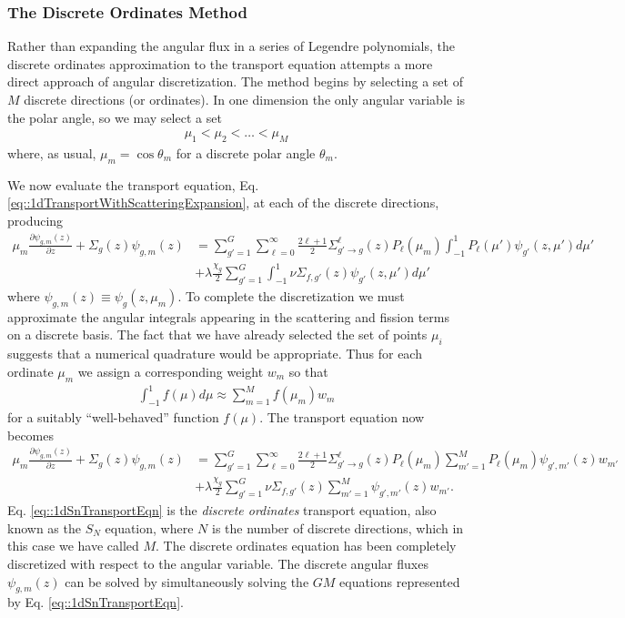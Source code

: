 \documentclass[11pt]{article}
\begin{document}
\subsubsection{The Discrete Ordinates Method}
\label{sec:orgheadline54}
Rather than expanding the angular flux in a series of Legendre polynomials, the discrete ordinates approximation to the transport equation attempts a more direct approach of angular discretization.  The method begins by selecting a set of \(M\) discrete directions (or ordinates).  In one dimension the only angular variable is the polar angle, so we may select a set
\begin{align*}
  \mu_1 < \mu_2 < \hdots < \mu_{M}
\end{align*}
where, as usual, \(\mu_m = \cos\theta_m\) for a discrete polar angle \(\theta_m\).

We now evaluate the transport equation, Eq. \eqref{eq::1dTransportWithScatteringExpansion}, at each of the discrete directions, producing
\begin{align}
  \mu_m \frac{\partial \psi_{g,m}(z)}{\partial z}
  + \Sigma_g(z) \psi_{g,m}(z)
  &= \sum_{g'=1}^G \sum_{\ell=0}^\infty \frac{2\ell+1}{2} \Sigma_{g' \rightarrow g}^\ell(z) P_\ell(\mu_m) \int_{-1}^1 P_\ell(\mu') \psi_{g'}(z,\mu') d\mu' \\
  &+ \lambda\frac{\chi_g}{2} \sum_{g'=1}^G \int_{-1}^1 \nu\Sigma_{f,g'}(z) \psi_{g'}(z,\mu') d\mu'
\end{align}
where \(\psi_{g,m}(z) \equiv \psi_g(z,\mu_m)\).  To complete the discretization we must approximate the angular integrals appearing in the scattering and fission terms on a discrete basis.  The fact that we have already selected the set of points \(\mu_i\) suggests that a numerical quadrature would be appropriate.  Thus for each ordinate \(\mu_m\) we assign a corresponding weight \(w_m\) so that
\begin{align*}
  \int_{-1}^1 f(\mu) d\mu \approx \sum_{m=1}^M f(\mu_m) w_m
\end{align*}
for a suitably ``well-behaved'' function \(f(\mu)\).  The transport equation now becomes
\begin{align}
  \mu_m \frac{\partial \psi_{g,m}(z)}{\partial z}
  + \Sigma_g(z) \psi_{g,m}(z)
  &= \sum_{g'=1}^G \sum_{\ell=0}^\infty \frac{2\ell+1}{2} \Sigma_{g' \rightarrow g}^\ell(z) P_\ell(\mu_m) \sum_{m'=1}^M P_\ell(\mu_m) \psi_{g',m'}(z) w_{m'} \\
  &+ \lambda\frac{\chi_g}{2} \sum_{g'=1}^G \nu\Sigma_{f,g'}(z) \sum_{m'=1}^M  \psi_{g',m'}(z) w_{m'}.
  \label{eq::1dSnTransportEqn}
\end{align}
Eq. \eqref{eq::1dSnTransportEqn} is the \emph{discrete ordinates} transport equation, also known as the \(S_N\) equation, where \(N\) is the number of discrete directions, which in this case we have called \(M\).  The discrete ordinates equation has been completely discretized with respect to the angular variable.  The discrete angular fluxes \(\psi_{g,m}(z)\) can be solved by simultaneously solving the \(GM\) equations represented by Eq. \eqref{eq::1dSnTransportEqn}.
\end{document}
